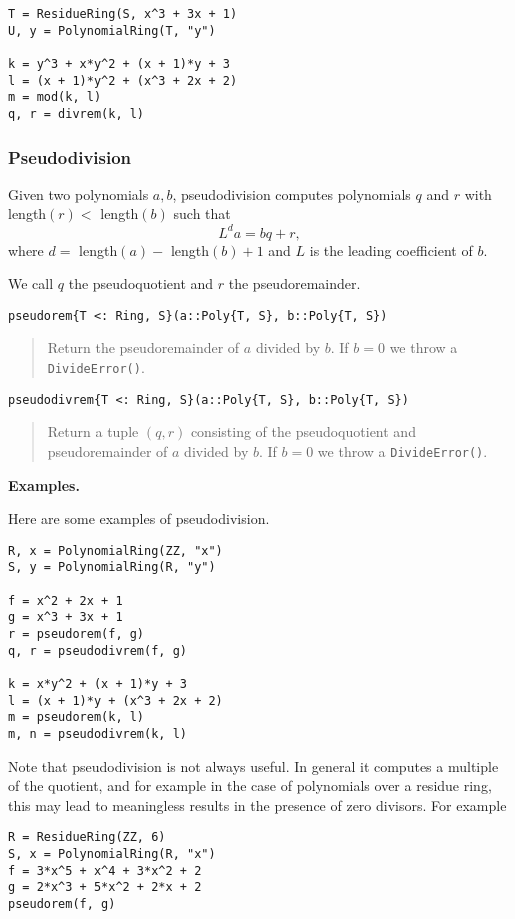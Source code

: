 \documentclass[a4paper,10pt]{article}
\newcommand{\code}{\lstinline}
\newcommand{\desc}[1]{\vspace{-3mm}\begin{quote}#1\end{quote}}
\begin{document}
{{{\begin{lstlisting}
T = ResidueRing(S, x^3 + 3x + 1)
U, y = PolynomialRing(T, "y")

k = y^3 + x*y^2 + (x + 1)*y + 3
l = (x + 1)*y^2 + (x^3 + 2x + 2)
m = mod(k, l)
q, r = divrem(k, l)
\end{lstlisting}

\subsubsection{Pseudodivision}

Given two polynomials $a, b$, pseudodivision computes polynomials $q$ and $r$
with length$(r) <$ length$(b)$ such that
$$L^d a = bq + r,$$
where $d =$ length$(a) -$ length$(b) + 1$ and $L$ is the leading coefficient
of $b$.

We call $q$ the pseudoquotient and $r$ the pseudoremainder.

\begin{lstlisting}
pseudorem{T <: Ring, S}(a::Poly{T, S}, b::Poly{T, S})
\end{lstlisting}

\desc{Return the pseudoremainder of $a$ divided by $b$. If $b = 0$ we throw a 
\code{DivideError()}.}

\begin{lstlisting}
pseudodivrem{T <: Ring, S}(a::Poly{T, S}, b::Poly{T, S})
\end{lstlisting}

\desc{Return a tuple $(q, r)$ consisting of the pseudoquotient and pseudoremainder 
of $a$ divided by $b$. If $b = 0$ we throw a \code{DivideError()}.}

\textbf{Examples.}

Here are some examples of pseudodivision.

\begin{lstlisting}
R, x = PolynomialRing(ZZ, "x")
S, y = PolynomialRing(R, "y")

f = x^2 + 2x + 1
g = x^3 + 3x + 1
r = pseudorem(f, g)
q, r = pseudodivrem(f, g)

k = x*y^2 + (x + 1)*y + 3
l = (x + 1)*y + (x^3 + 2x + 2)
m = pseudorem(k, l)
m, n = pseudodivrem(k, l)
\end{lstlisting}

Note that pseudodivision is not always useful. In general it computes a
multiple of the quotient, and for example in the case of polynomials over a
residue ring, this may lead to meaningless results in the presence of zero
divisors. For example

\begin{lstlisting}
R = ResidueRing(ZZ, 6)
S, x = PolynomialRing(R, "x")
f = 3*x^5 + x^4 + 3*x^2 + 2
g = 2*x^3 + 5*x^2 + 2*x + 2
pseudorem(f, g)
\end{lstlisting}

}}}
\end{document}
